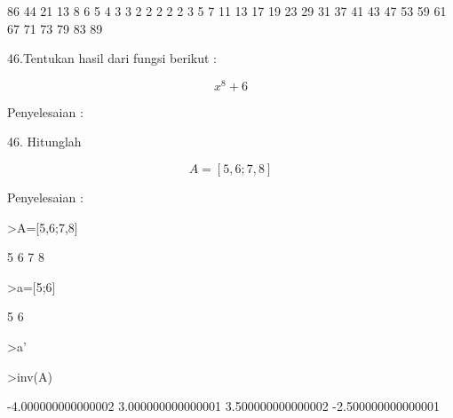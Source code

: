 \documentclass[a4paper,10pt]{article}
\begin{document}
\begin{eulernotebook}
\begin{eulercomment}
\begin{eulercomment}
\begin{eulercomment}
\begin{eulercomment}
\begin{eulercomment}
\begin{eulercomment}
\begin{eulercomment}
\begin{eulercomment}
\begin{euleroutput}
           86  44  21  13   8   6   5   4   3   3   2   2   2   2
          2   3   5   7   11  13  17  19  23  29  31  37  41  43  47 53
                                                 59 61 67 71 73 79 83 89
  
\end{euleroutput}
\begin{eulercomment}
46.Tentukan hasil dari fungsi berikut :\\
\end{eulercomment}
\begin{eulerformula}
\[
x^8+6
\]
\end{eulerformula}
\begin{eulercomment}
Penyelesaian :


\end{eulercomment}
\begin{eulercomment}
46. Hitunglah\\
\end{eulercomment}
\begin{eulerformula}
\[
A=[5,6;7,8]
\]
\end{eulerformula}
\begin{eulercomment}
Penyelesaian :
\end{eulercomment}
\begin{eulerprompt}
>A=[5,6;7,8]
\end{eulerprompt}
\begin{euleroutput}
                        5                       6 
                        7                       8 
\end{euleroutput}
\begin{eulerprompt}
>a=[5;6]
\end{eulerprompt}
\begin{euleroutput}
                        5 
                        6 
\end{euleroutput}
\begin{eulerprompt}
>a'
\end{eulerprompt}
\begin{euleroutput}
  [5,  6]
\end{euleroutput}
\begin{eulerprompt}
>inv(A)
\end{eulerprompt}
\begin{euleroutput}
       -4.000000000000002       3.000000000000001 
        3.500000000000002      -2.500000000000001 
\end{euleroutput}
\begin{eulerprompt}

\end{eulerprompt}
\end{eulercomment}
\end{eulercomment}
\end{eulercomment}
\end{eulercomment}
\end{eulercomment}
\end{eulercomment}
\end{eulercomment}
\end{eulercomment}
\end{eulernotebook}
\end{document}
